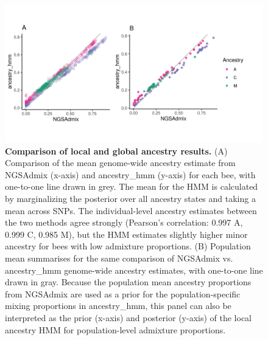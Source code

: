 \begin{figure}[p]
\includegraphics[width=\textwidth]{chapter1/figures/mean_ancestry_prior_posterior_ancestry_hmm.png}
\caption{ \textbf{Comparison of local and global ancestry results.} (A) Comparison of the mean genome-wide ancestry estimate from NGSAdmix (x-axis) and ancestry\_hmm (y-axis) for each bee, with one-to-one line drawn in grey. The mean for the HMM is calculated by marginalizing the posterior over all ancestry states and taking a mean across SNPs. The individual-level ancestry estimates between the two methods agree strongly (Pearson's correlation: 0.997 A, 0.999 C, 0.985 M), but the HMM estimates slightly higher minor ancestry for bees with low admixture proportions. (B) Population mean summarises for the same comparison of NGSAdmix vs. ancestry\_hmm genome-wide ancestry estimates, with one-to-one line drawn in gray. Because the population mean ancestry proportions from NGSAdmix are used as a prior for the population-specific mixing proportions in ancestry\_hmm, this panel can also be interpreted as the prior (x-axis) and posterior (y-axis) of the local ancestry HMM for population-level admixture proportions.}
\label{ngsadmix_vs_ancestry_hmm}
\end{figure}

